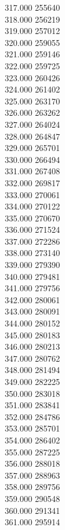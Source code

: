 { 317.000	255640 \\
 318.000	256219 \\
 319.000	257012 \\
 320.000	259055 \\
 321.000	259146 \\
 322.000	259725 \\
 323.000	260426 \\
 324.000	261402 \\
 325.000	263170 \\
 326.000	263262 \\
 327.000	264024 \\
 328.000	264847 \\
 329.000	265701 \\
 330.000	266494 \\
 331.000	267408 \\
 332.000	269817 \\
 333.000	270061 \\
 334.000	270122 \\
 335.000	270670 \\
 336.000	271524 \\
 337.000	272286 \\
 338.000	273140 \\
 339.000	279390 \\
 340.000	279481 \\
 341.000	279756 \\
 342.000	280061 \\
 343.000	280091 \\
 344.000	280152 \\
 345.000	280183 \\
 346.000	280213 \\
 347.000	280762 \\
 348.000	281494 \\
 349.000	282225 \\
 350.000	283018 \\
 351.000	283841 \\
 352.000	284786 \\
 353.000	285701 \\
 354.000	286402 \\
 355.000	287225 \\
 356.000	288018 \\
 357.000	288963 \\
 358.000	289756 \\
 359.000	290548 \\
 360.000	291341 \\
 361.000	295914 \\
}

